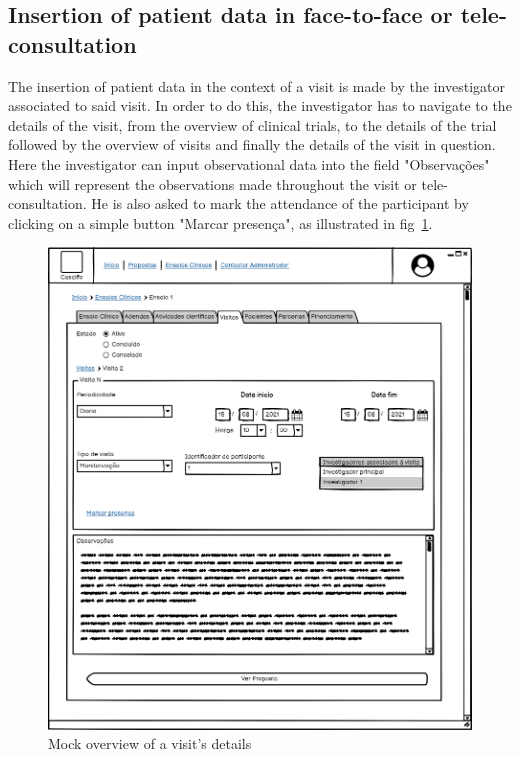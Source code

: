 \subsection{Insertion of patient data in face-to-face or tele-consultation}

The insertion of patient data in the context of a visit is made by the investigator associated to said visit. In order to do this, the investigator has to navigate to the details of the visit, from the overview of clinical trials, to the details of the trial followed by the overview of visits and finally the details of the visit in question. Here the investigator can input observational data into the field "Observações" which will represent the observations made throughout the visit or tele-consultation. He is also asked to mark the attendance of the participant by clicking on a simple button "Marcar presença", as illustrated in fig~\ref{fig:ensaio-visita-detalhes}.

\begin{figure}[H]
    \centering
    \includegraphics[scale=0.35]{images/ensaio-visita-detalhes.png}
    \caption{Mock overview of a visit's details}
    \label{fig:ensaio-visita-detalhes}
\end{figure}


